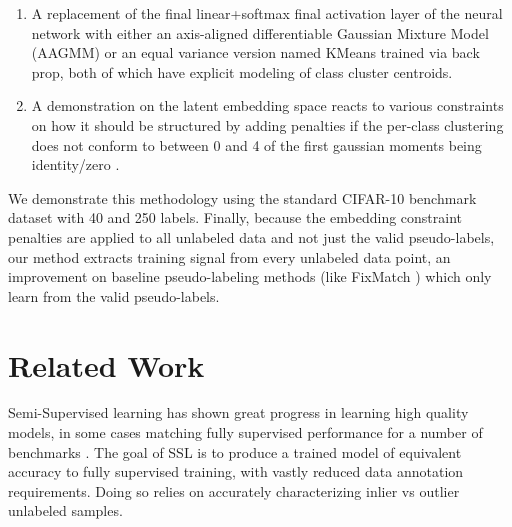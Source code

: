 \documentclass[10pt,twocolumn,letterpaper]{article}
\begin{document}
\begin{enumerate}
	\item A replacement of the final linear+softmax final activation layer of the neural network with either an axis-aligned differentiable Gaussian Mixture Model (AAGMM) or an equal variance version named KMeans trained via back prop, both of which have explicit modeling of class cluster centroids. 
	\item A demonstration on the latent embedding space reacts to various constraints on how it should be structured by adding penalties if the per-class clustering does not conform to between 0 and 4 of the first gaussian moments being identity/zero \cite{pearson1936method}.
\end{enumerate}

We demonstrate this methodology using the standard CIFAR-10 benchmark dataset with 40 and 250 labels\cite{cifar10}. %
Finally, because the embedding constraint penalties are applied to all unlabeled data and not just the valid pseudo-labels, our method extracts training signal from every unlabeled data point, an improvement on baseline pseudo-labeling methods (like FixMatch \cite{sohn2020fixmatch}) which only learn from the valid pseudo-labels.


\section{Related Work}


Semi-Supervised learning has shown great progress in learning high quality models, in some cases matching fully supervised performance for a number of benchmarks \cite{zhang2021flexmatch}.
The goal of SSL is to produce a trained model of equivalent accuracy to fully supervised training, with vastly reduced data annotation requirements.
Doing so relies on accurately characterizing inlier vs outlier unlabeled samples.
\end{document}
